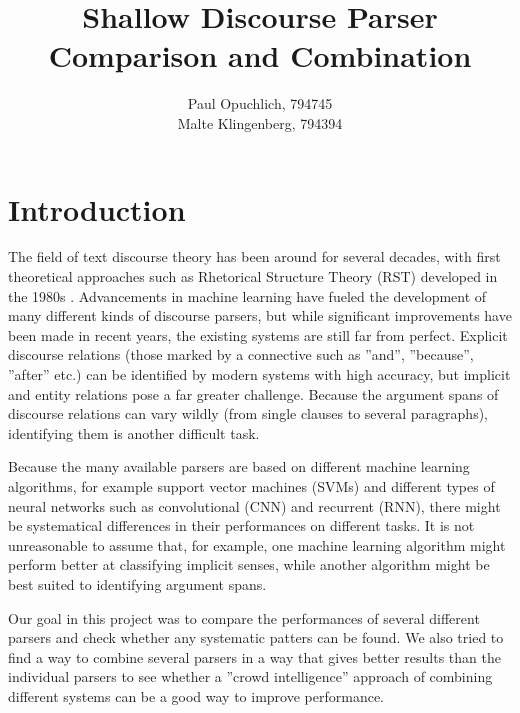 \documentclass[10pt,notitlepage]{scrartcl}
\author{Paul Opuchlich, 794745\\Malte Klingenberg, 794394}
\title{Shallow Discourse Parser Comparison and Combination}
\date{}
\begin{document}
\maketitle

\section*{Introduction}
The field of text discourse theory has been around for several decades, with first theoretical approaches such as Rhetorical Structure Theory (RST) developed in the 1980s \cite{mann1988rhetorical}. Advancements in machine learning have fueled the development of many different kinds of discourse parsers, but while significant improvements have been made in recent years, the existing systems are still far from perfect. Explicit discourse relations (those marked by a connective such as ''and'', ''because'', ''after'' etc.) can be identified by modern systems with high accuracy, but implicit and entity relations pose a far greater challenge. Because the argument spans of discourse relations can vary wildly (from single clauses to several paragraphs), identifying them is another difficult task.

Because the many available parsers are based on different machine learning algorithms, for example support vector machines (SVMs) and different types of neural networks such as convolutional (CNN) and recurrent (RNN), there might be systematical differences in their performances on different tasks. It is not unreasonable to assume that, for example, one machine learning algorithm might perform better at classifying implicit senses, while another algorithm might be best suited to identifying argument spans.

Our goal in this project was to compare the performances of several different parsers and check whether any systematic patters can be found. We also tried to find a way to combine several parsers in a way that gives better results than the individual parsers to see whether a ''crowd intelligence'' approach of combining different systems can be a good way to improve performance.

\end{document}
